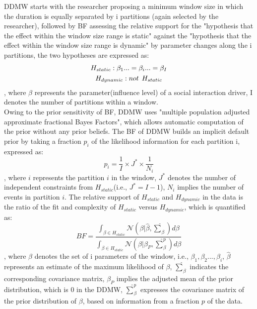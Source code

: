 \documentclass[]{interact}
\theoremstyle{plain}%
\theoremstyle{definition}
\theoremstyle{remark}
\begin{document}
DDMW starts with the researcher proposing a minimum window size in which the duration is equally separated by i partitions (again selected by the researcher), followed by BF assessing the relative support for the "hypothesis that the effect within the window size range is static" against the "hypothesis that the effect within the window size range is dynamic" by parameter changes along the i partitions, the two hypotheses are expressed as:
\begin{gather} \label{4, 5}
	H_{static}: \beta_1... = \beta_i... = \beta_I \\ 
	H_{dynamic}: not\hspace{0.15cm} H_{static}
\end{gather} 
, where $\beta$ represents the parameter(influence level) of a social interaction driver, I denotes the number of partitions within a window.\\

Owing to the prior sensitivity of BF, DDMW uses "multiple population adjusted approximate fractional Bayes Factors", which allows automatic computation of the prior without any prior beliefs. The BF of DDMW builds an implicit default prior by taking a fraction $p_i$ of the likelihood information for each partition i, expressed as\cite{hoijtinkBayesianEvaluationInformative2019}:
\begin{equation} \label{6}
	p_i = \dfrac{1}{I} \times J^* \times \dfrac{1}{N_i}
\end{equation}
, where $i$ represents the partition $i$ in the window, $J^*$ denotes the number of independent constraints from $H_{static}$(i.e., $J^* = I - 1$), $N_i$ implies the number of events in partition $i$. The relative support of $H_{static}$ and $H_{dynamic}$ in the data is the ratio of the fit and complexity of $H_{static}$ versus $H_{dynamic}$, which is quantified as\cite{meijerink-bosmanDynamicRelationalEvent2022}: 
\begin{equation} \label{7}
	BF = \dfrac{\int_{\beta \in H_{static}} \mathcal{N}(\beta|\hat{\beta}, \hat{\sum}_{\beta}) d\beta}
	{\int_{\beta \in H_{static}} \mathcal{N}(\beta|\beta_P, \hat{\sum} ^p _{\beta}) d\beta}
\end{equation}
, where $\beta$ denotes the set of i parameters of the window, i.e., $\beta_1, \beta_2... , \beta_i$, $\hat{\beta}$ represents an estimate of the maximum likelihood of $\beta$, $\hat{\sum}_\beta$ indicates the corresponding covariance matrix, $\beta_P$ implies the adjusted mean of the prior distribution, which is 0 in the DDMW, $\hat{\sum} ^p _\beta$ expresses the covariance matrix of the prior distribution of $\beta$, based on information from a fraction $p$ of the data.\\
\end{document}
